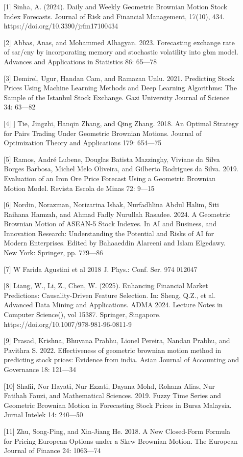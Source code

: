 \begin{talk}
\begin{enumerate}
	\item[{[1]}] Sinha, A. (2024). Daily and Weekly Geometric Brownian Motion Stock Index Forecasts. Journal of Risk and Financial Management, 17(10), 434. https://doi.org/10.3390/jrfm17100434
	\item[{[2]}] Abbas, Anas, and Mohammed Alhagyan. 2023. Forecasting exchange rate of sar/cny by incorporating memory and stochastic volatility into gbm model. Advances and Applications in Statistics 86: 65---78
    \item[{[3]}] Demirel, Ugur, Handan Cam, and Ramazan Unlu. 2021. Predicting Stock Prices Using Machine Learning Methods and Deep Learning Algorithms: The Sample of the Istanbul Stock Exchange. Gazi University Journal of Science 34: 63---82
    \item[{[4]}]] Tie, Jingzhi, Hanqin Zhang, and Qing Zhang. 2018. An Optimal Strategy for Pairs Trading Under Geometric Brownian Motions. Journal of Optimization Theory and Applications 179: 654---75
    \item[{[5]}] Ramos, André Lubene, Douglas Batista Mazzinghy, Viviane da Silva Borges Barbosa, Michel Melo Oliveira, and Gilberto Rodrigues da Silva. 2019. Evaluation of an Iron Ore Price Forecast Using a Geometric Brownian Motion Model. Revista Escola de Minas 72: 9---15
    \item[{[6]}] Nordin, Norazman, Norizarina Ishak, Nurfadhlina Abdul Halim, Siti Raihana Hamzah, and Ahmad Fadly Nurullah Rasadee. 2024. A Geometric Brownian Motion of ASEAN-5 Stock Indexes. In AI and Business, and Innovation Research: Understanding the Potential and Risks of AI for Modern Enterprises. Edited by Bahaaeddin Alareeni and Islam Elgedawy. New York: Springer, pp. 779---86
    \item[{[7]}]W Farida Agustini et al 2018 J. Phys.: Conf. Ser. 974 012047
    \item[{[8]}] Liang, W., Li, Z., Chen, W. (2025). Enhancing Financial Market Predictions: Causality-Driven Feature Selection. In: Sheng, Q.Z., et al. Advanced Data Mining and Applications. ADMA 2024. Lecture Notes in Computer Science(), vol 15387. Springer, Singapore. https://doi.org/10.1007/978-981-96-0811-9
    \item[{[9]}] Prasad, Krishna, Bhuvana Prabhu, Lionel Pereira, Nandan Prabhu, and Pavithra S. 2022. Effectiveness of geometric brownian motion method in predicting stock prices: Evidence from india. Asian Journal of Accounting and Governance 18: 121---34
    \item[{[10]}] Shafii, Nor Hayati, Nur Ezzati, Dayana Mohd, Rohana Alias, Nur Fatihah Fauzi, and Mathematical Sciences. 2019. Fuzzy Time Series and Geometric Brownian Motion in Forecasting Stock Prices in Bursa Malaysia. Jurnal Intelek 14: 240---50
    \item[{[11]}] Zhu, Song-Ping, and Xin-Jiang He. 2018. A New Closed-Form Formula for Pricing European Options under a Skew Brownian Motion. The European Journal of Finance 24: 1063---74
\end{enumerate}

\end{talk}

